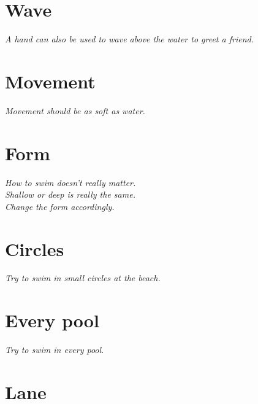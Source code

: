 \documentclass[11pt, openany]{book}
\begin{document}
\chapter{Wave}

\begin{center}
  {\Large\itshape\color{deepwater} A hand can also be used to wave above the water to greet a friend.}
\end{center}

\chapter{Movement}

\begin{center}
  {\Large\itshape\color{deepwater} Movement should be as soft as water.}
\end{center}

\chapter{Form}

\begin{center}
  {\Large\itshape\color{deepwater} How to swim doesn't really matter.}\\[0.8em]
  {\Large\itshape\color{deepwater} Shallow or deep is really the same.}\\[0.8em]
  {\Large\itshape\color{deepwater} Change the form accordingly.}
\end{center}

\chapter{Circles}

\begin{center}
  {\Large\itshape\color{deepwater} Try to swim in small circles at the beach.}
\end{center}

\chapter{Every pool}

\begin{center}
  {\Large\itshape\color{deepwater} Try to swim in every pool.}
\end{center}

\chapter{Lane}
\end{document}
